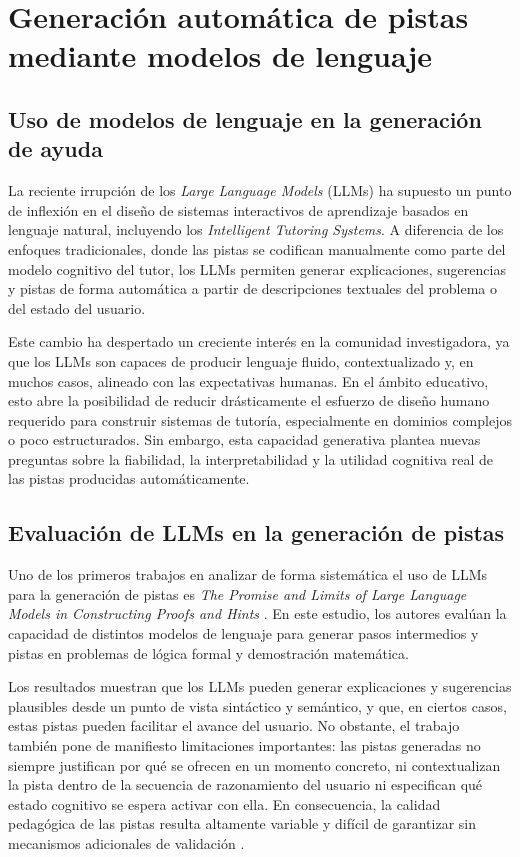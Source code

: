 \documentclass[../main.tex]{subfiles}
\begin{document}
\section{Generación automática de pistas mediante modelos de lenguaje}

\subsection{Uso de modelos de lenguaje en la generación de ayuda}

La reciente irrupción de los \textit{Large Language Models} (LLMs) ha supuesto un punto de inflexión en el diseño de sistemas interactivos de aprendizaje basados en lenguaje natural, incluyendo los \textit{Intelligent Tutoring Systems}. A diferencia de los enfoques tradicionales, donde las pistas se codifican manualmente como parte del modelo cognitivo del tutor, los LLMs permiten generar explicaciones, sugerencias y pistas de forma automática a partir de descripciones textuales del problema o del estado del usuario.

Este cambio ha despertado un creciente interés en la comunidad investigadora, ya que los LLMs son capaces de producir lenguaje fluido, contextualizado y, en muchos casos, alineado con las expectativas humanas. En el ámbito educativo, esto abre la posibilidad de reducir drásticamente el esfuerzo de diseño humano requerido para construir sistemas de tutoría, especialmente en dominios complejos o poco estructurados. Sin embargo, esta capacidad generativa plantea nuevas preguntas sobre la fiabilidad, la interpretabilidad y la utilidad cognitiva real de las pistas producidas automáticamente.

\subsection{Evaluación de LLMs en la generación de pistas}

Uno de los primeros trabajos en analizar de forma sistemática el uso de LLMs para la generación de pistas es \textit{The Promise and Limits of Large Language Models in Constructing Proofs and Hints} \cite{Kaliszyk2023PromiseLimits}. En este estudio, los autores evalúan la capacidad de distintos modelos de lenguaje para generar pasos intermedios y pistas en problemas de lógica formal y demostración matemática.

Los resultados muestran que los LLMs pueden generar explicaciones y sugerencias plausibles desde un punto de vista sintáctico y semántico, y que, en ciertos casos, estas pistas pueden facilitar el avance del usuario. No obstante, el trabajo también pone de manifiesto limitaciones importantes: las pistas generadas no siempre justifican por qué se ofrecen en un momento concreto, ni contextualizan la pista dentro de la secuencia de razonamiento del usuario ni especifican qué estado cognitivo se espera activar con ella. En consecuencia, la calidad pedagógica de las pistas resulta altamente variable y difícil de garantizar sin mecanismos adicionales de validación \cite{Phung2024GPT4Hints}.
\end{document}
